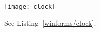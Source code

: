 %
%
\begin{figure}
  \centering
  \texttt{[image: clock]}
  \caption{See Listing~\ref{winforms/clock}.}
  \label{fig:clock}
\end{figure}

